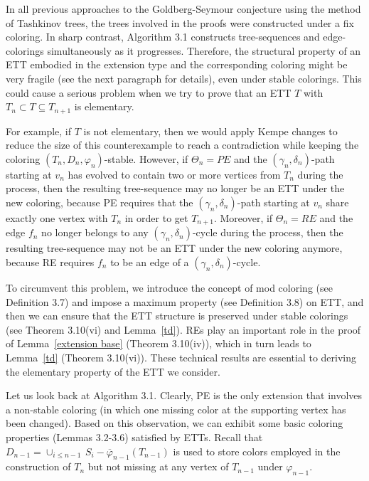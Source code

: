 \documentclass[11pt]{article}
\newcommand{\phibar}{\overline{\varphi}}
\begin{document}
In all previous approaches to the Goldberg-Seymour conjecture using the method of Tashkinov trees,
the trees involved in the proofs were constructed under a fix coloring. In sharp contrast, Algorithm 3.1 constructs tree-sequences and 
edge-colorings simultaneously as it progresses. Therefore, the structural property of an ETT embodied in the extension type and the corresponding 
coloring might be very fragile (see the next paragraph for details), even under stable colorings. This could cause a serious problem when we try to prove that an 
ETT $T$ with $T_n\subset T\subseteq T_{n+1}$ is elementary.


For example, if $T$ is not elementary, then we would apply Kempe changes to reduce the size of this counterexample to reach a contradiction while keeping 
the coloring $(T_n,D_n,\varphi_n)$-stable. However, if $\Theta_n=PE$ and the $(\gamma_n,\delta_n)$-path starting at $v_n$ has evolved to 
contain two or more vertices from $T_n$ during the process, then the resulting tree-sequence may no longer be an ETT under the new coloring, because PE requires that 
the $(\gamma_n,\delta_n)$-path starting at $v_n$ share exactly one vertex with $T_n$ in order to get $T_{n+1}$. Moreover, if $\Theta_n=RE$ and the edge $f_n$ 
no longer belongs to any $(\gamma_n,\delta_n)$-cycle during the process, then the resulting tree-sequence may not be an ETT under the new coloring anymore, because RE 
requires $f_n$ to be an edge of a $(\gamma_n,\delta_n)$-cycle.  

To circumvent this problem, we introduce the concept of mod coloring (see Definition 3.7) and impose a maximum property (see Definition 3.8) on ETT, 
and then we can ensure that the ETT structure is preserved under stable colorings (see Theorem 3.10(vi) and Lemma~\ref{td}). REs play an important role in the 
proof of Lemma~\ref{extension base} (Theorem 3.10(iv)), which in turn leads to Lemma~\ref{td} (Theorem 3.10(vi)). These technical results are essential to deriving the elementary 
property of the ETT we consider.

\vskip 2mm

Let us look back at Algorithm 3.1. Clearly, PE is the only extension that involves a non-stable coloring (in which one missing color at the 
supporting vertex has been changed). Based on this observation, we can exhibit some basic coloring properties (Lemmas 3.2-3.6) satisfied by 
ETTs. Recall that $D_{n-1}=\cup_{i \le n-1} \, S_i - \phibar_{n-1}(T_{n-1})$ is used to store colors employed in the construction of 
$T_n$ but not missing at any vertex of $T_{n-1}$ under $\varphi_{n-1}$.
\end{document}
